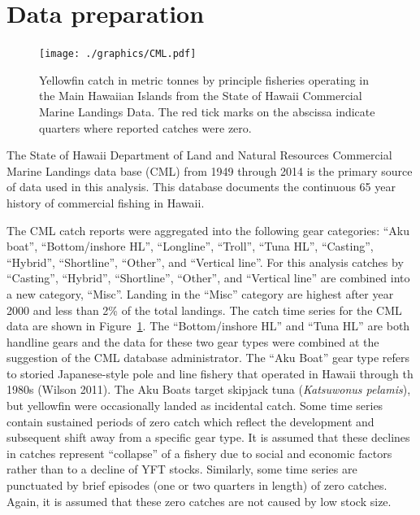 \documentclass[12pt,letterpaper]{article}
\begin{document}
\clearpage


\appendix
\section{Data preparation}
\label{sec:data}

\begin{figure}
\begin{center}
\texttt{[image: ./graphics/CML.pdf]}
\caption{\label{fig:CMLdata}
Yellowfin catch in metric tonnes by principle fisheries operating in
the Main Hawaiian Islands from the State of Hawaii Commercial Marine
Landings Data.
The red tick marks on the abscissa indicate quarters where reported
catches were zero.
}
\end{center}
\end{figure}


The State of Hawaii Department of Land and Natural Resources
Commercial Marine Landings data base (CML) from 1949 through 2014 is
the primary source of data used in this analysis. This database
documents the
continuous 65 year history of commercial fishing in Hawaii.


The CML catch reports were aggregated into the following gear categories:
``Aku boat'', ``Bottom/inshore HL'', ``Longline'',  ``Troll'', ``Tuna
HL'', ``Casting'', ``Hybrid'',  ``Shortline'', ``Other'', and
``Vertical line''.
For this analysis catches by ``Casting'', ``Hybrid'',
``Shortline'', ``Other'', and ``Vertical line'' are combined into a new
category, ``Misc''. Landing in the ``Misc'' category are highest after
year 2000 and less than  2\% of the total landings.
The catch time series for the CML data are shown in
Figure~\ref{fig:CMLdata}.
The ``Bottom/inshore HL'' and ``Tuna HL'' are both handline gears and
the data for these two gear types were combined at the suggestion of
the CML database administrator.
The ``Aku Boat'' gear type refers to storied Japanese-style pole and
line fishery that operated in Hawaii through th 1980s (Wilson 2011). 
The Aku Boats target skipjack tuna 
({\it Katsuwonus pelamis}), but yellowfin were occasionally landed as
incidental catch.
Some time series contain sustained periods of zero catch which
reflect the development and subsequent shift away from a specific
gear type. It is assumed that these declines in catches represent
``collapse'' of a fishery due to social and economic factors rather than
to a decline of YFT stocks.
Similarly, some time series are punctuated by brief episodes (one or two quarters in
length) of zero catches. Again, it is assumed that these zero catches
are not caused by low stock size.
\end{document}

